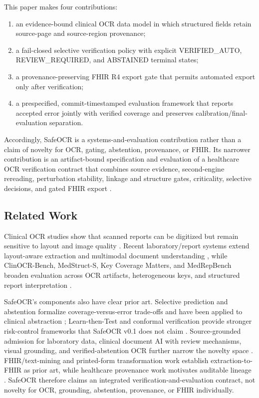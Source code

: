 \documentclass[10pt]{article}
\begin{document}
This paper makes four contributions:

\begin{enumerate}
\item an evidence-bound clinical OCR data model in which structured fields retain source-page and source-region provenance;
\item a fail-closed selective verification policy with explicit VERIFIED\_AUTO, REVIEW\_REQUIRED, and ABSTAINED terminal states;
\item a provenance-preserving FHIR R4 export gate that permits automated export only after verification;
\item a prespecified, commit-timestamped evaluation framework that reports accepted error jointly with verified coverage and preserves calibration/final-evaluation separation.
\end{enumerate}

Accordingly, SafeOCR is a systems-and-evaluation contribution rather than a claim of novelty for OCR, gating, abstention, provenance, or FHIR. Its narrower contribution is an artifact-bound specification and evaluation of a healthcare OCR verification contract that combines source evidence, second-engine rereading, perturbation stability, linkage and structure gates, criticality, selective decisions, and gated FHIR export \cite{girda2026review}.

\subsection{Related Work}

Clinical OCR studies show that scanned reports can be digitized but remain sensitive to layout and image quality \cite{ma2023labocr,li2024tabular,hsu2022scanned}. Recent laboratory/report systems extend layout-aware extraction and multimodal document understanding \cite{ren2025serialization,schafer2025transfusion}, while ClinOCR-Bench, MedStruct-S, Key Coverage Matters, and MedRepBench broaden evaluation across OCR artifacts, heterogeneous keys, and structured report interpretation \cite{hsu2026clinocr,li2026medstructs,wang2026keycoverage,shang2026medrepbench}.

SafeOCR's components also have clear prior art. Selective prediction and abstention formalize coverage-versus-error trade-offs and have been applied to clinical abstraction \cite{geifman2019selectivenet,swaminathan2024selective}; Learn-then-Test and conformal verification provide stronger risk-control frameworks that SafeOCR v0.1 does not claim \cite{angelopoulos2025learntest,kim2025conformalEHR}. Source-grounded admission for laboratory data, clinical document AI with review mechanisms, visual grounding, and verified-abstention OCR further narrow the novelty space \cite{girda2026review,abioye2025raptor,abioye2026raptorplus,benhmida2025ontology}. FHIR/text-mining and printed-form transformation work establish extraction-to-FHIR as prior art, while healthcare provenance work motivates auditable lineage \cite{daumke2019fhir,miller2023smarttext2fhir,werlitz2025printedfhir,margheri2020provenance}. SafeOCR therefore claims an integrated verification-and-evaluation contract, not novelty for OCR, grounding, abstention, provenance, or FHIR individually.
\end{document}
